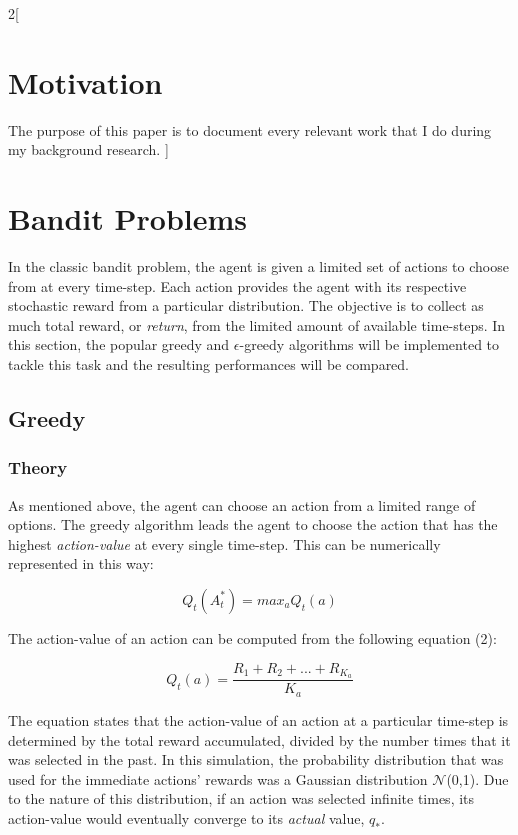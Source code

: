 \documentclass[a4paper]{article}
\begin{document}
	\begin{multicols}{2}[
		\section*{Motivation}
		The purpose of this paper is to document every relevant work that I do during my background research.
		]
		
		\section{Bandit Problems}
		In the classic bandit problem, the agent is given a limited set of actions to choose from at every time-step. Each action provides the agent with its respective stochastic reward from a particular distribution. The objective is to collect as much total reward, or \textit{return}, from the limited amount of available time-steps. In this section, the popular greedy and $\epsilon$-greedy algorithms will be implemented to tackle this task and the resulting performances will be compared.

		\subsection{Greedy}
		\subsubsection{Theory}
		As mentioned above, the agent can choose an action from a limited range of options. The greedy algorithm leads the agent to choose the action that has the highest \textit{action-value} at every single time-step. This can be numerically represented in this way: 
		
		\begin{equation}
			Q_t(A_t^*) = max_a Q_t(a)
		\end{equation}
		
		The action-value of an action can be computed from the following equation (2):
		
		\begin{equation}
			Q_t(a) = \frac{R_1 + R_2 + ... + R_{K_a}}{K_a}
		\end{equation}

		The equation states that the action-value of an action at a particular time-step is determined by the total reward accumulated, divided by the number times that it was selected in the past. In this simulation, the probability distribution that was used for the immediate actions' rewards was a Gaussian distribution $\mathcal{N}$(0,1). Due to the nature of this distribution, if an action was selected infinite times, its action-value would eventually converge to its \textit{actual} value, $q_*$.
		

\end{multicols}
\end{document}
